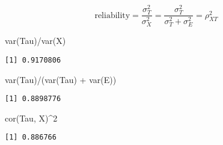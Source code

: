 \documentclass[
]{book}
\newenvironment{Shaded}{\begin{snugshade}}{\end{snugshade}}
\newcommand{\DecValTok}[1]{\textcolor[rgb]{0.00,0.00,0.81}{#1}}
\newcommand{\FunctionTok}[1]{\textcolor[rgb]{0.00,0.00,0.00}{#1}}
\newcommand{\NormalTok}[1]{#1}
\newcommand{\OtherTok}[1]{\textcolor[rgb]{0.56,0.35,0.01}{#1}}
\newcommand{\SpecialCharTok}[1]{\textcolor[rgb]{0.00,0.00,0.00}{#1}}
\begin{document}
\[
\text{reliability} = \frac{\sigma^2_T}{\sigma^2_X} = \frac{\sigma^2_T}{\sigma^2_T + \sigma^2_E} = \rho^2_{XT}
\]

\begin{Shaded}
\end{Shaded}

\begin{Shaded}
\begin{Highlighting}[]
\FunctionTok{var}\NormalTok{(Tau)}\SpecialCharTok{/}\FunctionTok{var}\NormalTok{(X)}
\end{Highlighting}
\end{Shaded}

\begin{verbatim}
[1] 0.9170806
\end{verbatim}

\begin{Shaded}
\begin{Highlighting}[]
\FunctionTok{var}\NormalTok{(Tau)}\SpecialCharTok{/}\NormalTok{(}\FunctionTok{var}\NormalTok{(Tau) }\SpecialCharTok{+} \FunctionTok{var}\NormalTok{(E))}
\end{Highlighting}
\end{Shaded}

\begin{verbatim}
[1] 0.8898776
\end{verbatim}

\begin{Shaded}
\begin{Highlighting}[]
\FunctionTok{cor}\NormalTok{(Tau, X)}\SpecialCharTok{\^{}}\DecValTok{2}
\end{Highlighting}
\end{Shaded}

\begin{verbatim}
[1] 0.886766
\end{verbatim}
\end{document}
